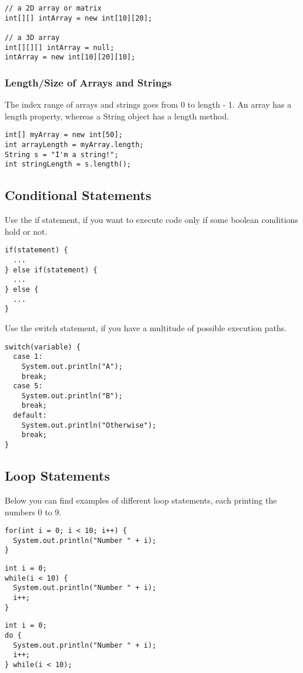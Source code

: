 \documentclass[papersize=a4,paper=landscape,11pt]{scrartcl}
\begin{document}
\begin{multicols*}{3}
\begin{lstlisting}
// a 2D array or matrix
int[][] intArray = new int[10][20];

// a 3D array
int[][][] intArray = null;
intArray = new int[10][20][10];
\end{lstlisting}

\subsubsection*{Length/Size of Arrays and Strings}
The index range of arrays and strings goes from 0 to length - 1.
An array has a length property, whereas a String object has a length method.

\begin{lstlisting}
int[] myArray = new int[50];
int arrayLength = myArray.length;
String s = "I'm a string!";
int stringLength = s.length();
\end{lstlisting}

\subsection*{Conditional Statements}
Use the if statement, if you want to execute code only if some boolean conditions hold or not.
\begin{lstlisting}
if(statement) {
  ...
} else if(statement) {
  ...
} else {
  ...
}
\end{lstlisting}
Use the switch statement, if you have a multitude of possible execution paths.
\begin{lstlisting}
switch(variable) {
  case 1:
    System.out.println("A");
    break;
  case 5:
    System.out.println("B");
    break;
  default:
    System.out.println("Otherwise");
    break;
}
\end{lstlisting}

\subsection*{Loop Statements}
Below you can find examples of different loop statements, each printing the numbers 0 to 9.
\begin{lstlisting}
for(int i = 0; i < 10; i++) {
  System.out.println("Number " + i);
}
\end{lstlisting}

\begin{lstlisting}
int i = 0;
while(i < 10) {
  System.out.println("Number " + i);
  i++;
}
\end{lstlisting}

\begin{lstlisting}
int i = 0;
do {
  System.out.println("Number " + i);
  i++;
} while(i < 10);
\end{lstlisting}


\end{multicols*}
\end{document}

